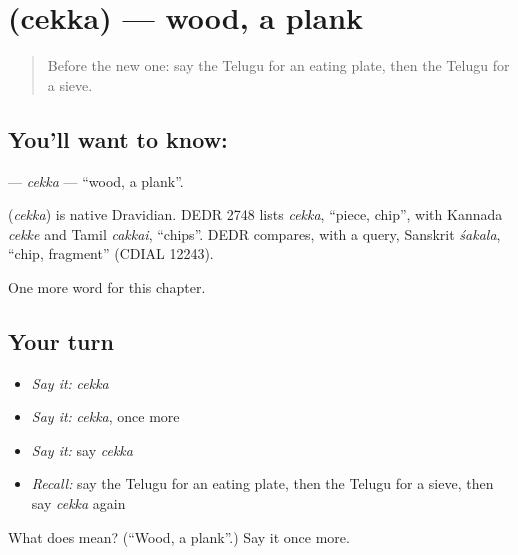 \section[\texorpdfstring{\te{చెక్క} (cekka)}{చెక్క (cekka)}]{ (cekka) — wood, a plank}

\label{lesson:TE-C269-cekka}



\begin{quote}
Before the new one: say the Telugu for an eating plate, then the Telugu for a sieve.
\end{quote}

\subsection*{You'll want to know: }
\textbf{} — \emph{cekka} — \textquotedblleft{}wood, a plank\textquotedblright{}.

\begin{cousinweb}
\textbf{} (\emph{cekka}) is native Dravidian. DEDR 2748 lists \emph{cekka}, \textquotedblleft{}piece, chip\textquotedblright{}, with Kannada \emph{cekke} and Tamil \emph{cakkai}, \textquotedblleft{}chips\textquotedblright{}. DEDR compares, with a query, Sanskrit \emph{śakala}, \textquotedblleft{}chip, fragment\textquotedblright{} (CDIAL 12243).
\end{cousinweb}

\begin{grammarlens}[title={What you've built}]
One more word for this chapter.
\end{grammarlens}

\subsection*{Your turn}
\begin{itemize}
\raggedright
  \item \emph{Say it:} \emph{cekka}
  \item \emph{Say it:} \emph{cekka}, once more
  \item \emph{Say it:} say \emph{cekka}
  \item \emph{Recall:} say the Telugu for an eating plate, then the Telugu for a sieve, then say \emph{cekka} again
\end{itemize}

\begin{tcolorbox}[breakable,colback=teal!4,colframe=teal!35!black,title={Before you move on}]
What does  mean? (\textquotedblleft{}Wood, a plank\textquotedblright{}.) Say it once more.
\end{tcolorbox}
